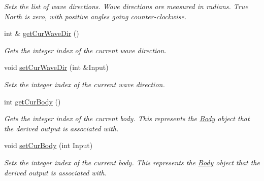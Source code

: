 \begin{DoxyCompactItemize}
\begin{DoxyCompactList}\small\item\em Sets the list of wave directions. Wave directions are measured in radians. True North is zero, with positive angles going counter-\/clockwise. \end{DoxyCompactList}\item 
int \& \hyperlink{classosea_1_1ofreq_1_1_output_derived_ad59fff8dc8f1772039aff4950a3cdf18}{get\-Cur\-Wave\-Dir} ()
\begin{DoxyCompactList}\small\item\em Gets the integer index of the current wave direction. \end{DoxyCompactList}\item 
void \hyperlink{classosea_1_1ofreq_1_1_output_derived_a174188431586c269edca5f17db16b498}{set\-Cur\-Wave\-Dir} (int \&Input)
\begin{DoxyCompactList}\small\item\em Sets the integer index of the current wave direction. \end{DoxyCompactList}\item 
int \hyperlink{classosea_1_1ofreq_1_1_output_derived_ac3a9e37f0f7bc0ac003d2662db3d17bb}{get\-Cur\-Body} ()
\begin{DoxyCompactList}\small\item\em Gets the integer index of the current body. This represents the \hyperlink{classosea_1_1ofreq_1_1_body}{Body} object that the derived output is associated with. \end{DoxyCompactList}\item 
void \hyperlink{classosea_1_1ofreq_1_1_output_derived_a56aa87d4a9aec5e21842bf614920c1dc}{set\-Cur\-Body} (int Input)
\begin{DoxyCompactList}\small\item\em Sets the integer index of the current body. This represents the \hyperlink{classosea_1_1ofreq_1_1_body}{Body} object that the derived output is associated with. \end{DoxyCompactList}\end{DoxyCompactItemize}
